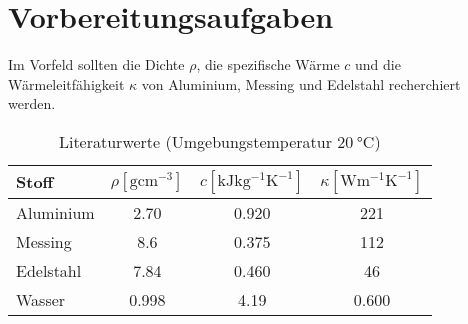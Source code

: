 \section{Vorbereitungsaufgaben}
\label{sec:Vorbereitungsaufgaben}
Im Vorfeld sollten die Dichte $\rho$, die spezifische Wärme $c$ und die Wärmeleitfähigkeit $\kappa$ von Aluminium, Messing
und Edelstahl recherchiert werden. 
\begin{table}
    \centering
    \caption{Literaturwerte (Umgebungstemperatur $\SI{20}{\celsius}$)}
    \label{tab:Literaturwerte}
    \begin{tabular}{l | S[table-format=1.3] S[table-format=1.3] c}
        \toprule
        Stoff & $\rho [\si{\gram\centi\meter\tothe{-3}}] $ & $c [\si{\kilo\joule\kilo\gram\tothe{-1}\kelvin\tothe{-1}}]$
        & $\kappa [\si{\watt\meter\tothe{-1}\kelvin\tothe{-1}}]$ \\
        \midrule
        Aluminium \cite{taschenbuch} & 2.70 & 0.920 & 221 \\
        Messing \cite{formelsammlung} & 8.6 &  0.375 & 112 \\
        Edelstahl \cite{taschenbuch} & 7.84 & 0.460 & 46 \\
        Wasser \cite{taschenbuch} & 0.998 & 4.19 & 0.600 \\ 
        \bottomrule
    \end{tabular}
\end{table}